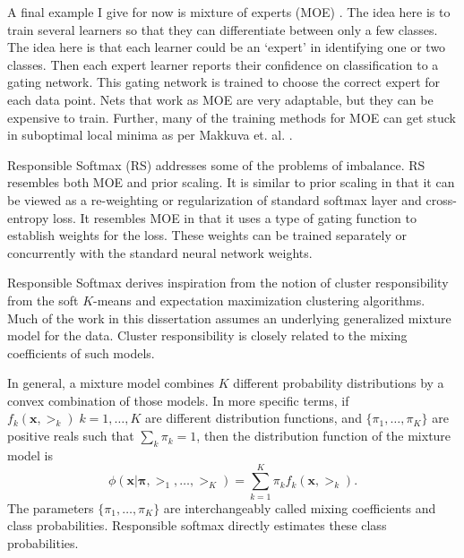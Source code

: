 A final example I give for now is mixture of experts (MOE) \cite{MOEJacobs}. The idea here is to train several learners so that they can differentiate between only a few classes.  The idea here is that each learner could be an `expert' in identifying one or two classes.  Then each expert learner reports their confidence on classification to a gating network.  This gating network is trained to choose the correct expert for each data point. Nets that work as MOE are very adaptable, but they can be expensive to train.  Further, many of the training methods for MOE can get stuck in suboptimal local minima as per Makkuva et. al. \cite{MOEGridlock}.

Responsible Softmax (RS) addresses some of the problems of imbalance. RS resembles both MOE and prior scaling.  It is similar to prior scaling in that it can be viewed as a re-weighting or regularization of standard softmax layer and cross-entropy loss. It resembles MOE in that it uses a type of gating function to establish weights for the loss. These weights can be trained separately or concurrently with the standard neural network weights.

Responsible Softmax derives inspiration from the notion of cluster responsibility from the soft \(K\)-means \citep[ch.20-22]{MacKay2002} and expectation maximization \cite{Dempster77EM,NealHintonEM1999} clustering algorithms.  Much of the work in this dissertation assumes an underlying generalized mixture model for the data. Cluster responsibility is closely related to the mixing coefficients of such models. 

In general, a mixture model combines \( K \) different probability distributions by a convex combination of those models.  In more specific terms, if \( f_k(\bm x,\bm\gt_k)\; k=1,\ldots,K \) are different distribution functions, and \( \{\pi_1,\ldots,\pi_K\} \) are positive reals such that \( \sum_k \pi_k =1 \), then the distribution function of the mixture model is 
\begin{equation}\label{eqn:mixtureDist}
\phi(\bm x|\bm\pi,\bm\gt_1,\ldots,\bm\gt_K) = \sum_{k=1}^{K} \pi_kf_k(\bm x,\bm\gt_k).
\end{equation}
The parameters \( \{\pi_1,\ldots,\pi_K\} \) are interchangeably called mixing coefficients and class probabilities.  Responsible softmax directly estimates these class probabilities.

